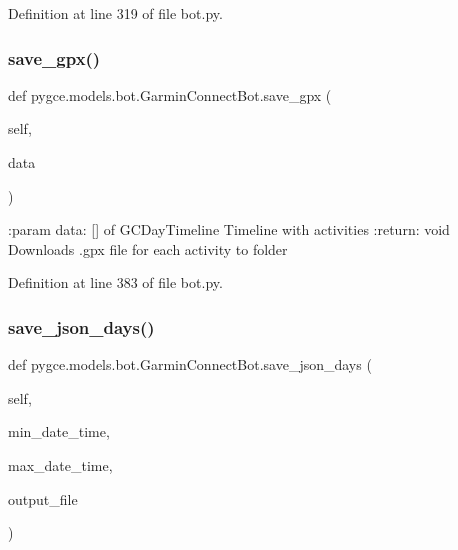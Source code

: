 Definition at line 319 of file bot.\+py.

\mbox{\label{classpygce_1_1models_1_1bot_1_1_garmin_connect_bot_a9cd831d6a4a8efdd793a395f99fc1796}} 
\subsubsection{\texorpdfstring{save\+\_\+gpx()}{save\_gpx()}}
{\footnotesize\ttfamily def pygce.\+models.\+bot.\+Garmin\+Connect\+Bot.\+save\+\_\+gpx (\begin{DoxyParamCaption}\item[{}]{self,  }\item[{}]{data }\end{DoxyParamCaption})}

\begin{DoxyVerb}:param data: [] of GCDayTimeline
    Timeline with activities
:return: void
    Downloads .gpx file for each activity to folder
\end{DoxyVerb}
 

Definition at line 383 of file bot.\+py.

\mbox{\label{classpygce_1_1models_1_1bot_1_1_garmin_connect_bot_a6b7760e4013e2ada06bed1a5f47133f1}} 
\subsubsection{\texorpdfstring{save\+\_\+json\+\_\+days()}{save\_json\_days()}}
{\footnotesize\ttfamily def pygce.\+models.\+bot.\+Garmin\+Connect\+Bot.\+save\+\_\+json\+\_\+days (\begin{DoxyParamCaption}\item[{}]{self,  }\item[{}]{min\+\_\+date\+\_\+time,  }\item[{}]{max\+\_\+date\+\_\+time,  }\item[{}]{output\+\_\+file }\end{DoxyParamCaption})}

